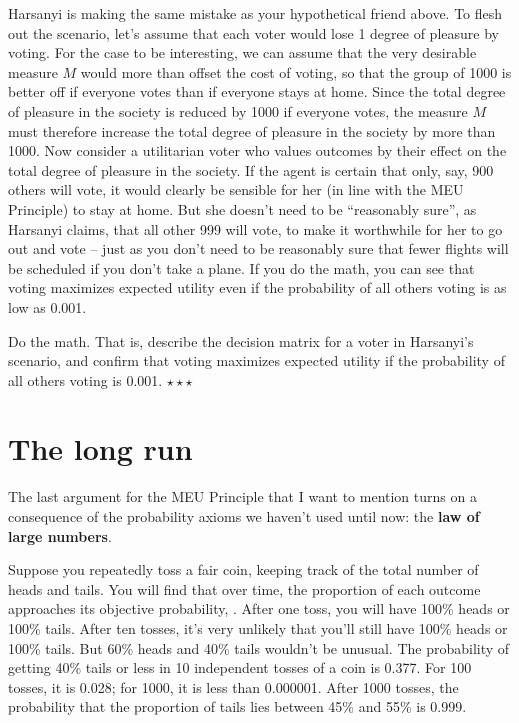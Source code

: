 Harsanyi is making the same mistake as your hypothetical friend
above. To flesh out the scenario, let's assume that each voter would
lose 1 degree of pleasure by voting. For the case to be interesting,
we can assume that the very desirable measure $M$ would more than
offset the cost of voting, so that the group of 1000 is better off if
everyone votes than if everyone stays at home. Since the total degree
of pleasure in the society is reduced by 1000 if everyone votes, the
measure $M$ must therefore increase the total degree of pleasure in
the society by more than 1000. Now consider a utilitarian voter who
values outcomes by their effect on the total degree of pleasure in the
society. If the agent is certain that only, say, 900 others will vote,
it would clearly be sensible for her (in line with the MEU Principle)
to stay at home. But she doesn't need to be ``reasonably sure'', as
Harsanyi claims, that all other 999 will vote, to make it worthwhile
for her to go out and vote -- just as you don't need to be reasonably
sure that fewer flights will be scheduled if you don't take a
plane. If you do the math, you can see that voting maximizes expected
utility even if the probability of all others voting is as low as
0.001.

\begin{exercise}
  Do the math. That is, describe the decision matrix for a voter in
  Harsanyi's scenario, and confirm that voting maximizes expected
  utility if the probability of all others voting is
  0.001. $\star\star\star$
\end{exercise}

\section{The long run}

The last argument for the MEU Principle that I want to mention turns
on a consequence of the probability axioms we haven't used until now:
the \textbf{law of large numbers}.

Suppose you repeatedly toss a fair coin, keeping track of the total
number of heads and tails. You will find that over time, the
proportion of each outcome approaches its objective probability,
. After one toss, you will have 100\% heads or 100\%
tails. After ten tosses, it's very unlikely that you'll still have
100\% heads or 100\% tails. But 60\% heads and 40\% tails wouldn't be
unusual. The probability of getting 40\% tails or less in 10
independent tosses of a coin is 0.377. For 100 tosses, it is 0.028;
for 1000, it is less than 0.000001. After 1000 tosses, the probability
that the proportion of tails lies between 45\% and 55\% is 0.999.

